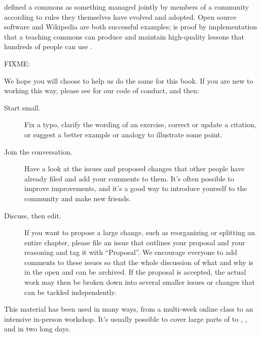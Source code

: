 
 defined a commons as
something managed jointly by members of a community
according to rules they themselves have evolved and adopted.
Open source software and Wikipedia are both successful examples;
 is proof by implementation that
a teaching commons can produce and maintain high-quality lessons
that hundreds of people can use \cite{Wils2016}.

FIXME: \cite{Deve2018}

We hope you will choose to help us do the same for this book.
If you are new to working this way,
please see  for our code of conduct,
and then:

\begin{description}

\item[Start small.]
  Fix a typo,
  clarify the wording of an exercise,
  correct or update a citation,
  or suggest a better example or analogy to illustrate some point.

\item[Join the conversation.]
  Have a look at the issues and proposed changes that other people have already filed
  and add your comments to them.
  It's often possible to improve improvements,
  and it's a good way to introduce yourself to the community and make new friends.

\item[Discuss, then edit.]
  If you want to propose a large change,
  such as reorganizing or splitting an entire chapter,
  please file an issue that outlines your proposal and your reasoning and tag it with ``Proposal''.
  We encourage everyone to add comments to these issues
  so that the whole discussion of what and why is in the open and can be archived.
  If the proposal is accepted,
  the actual work may then be broken down into several smaller issues or changes
  that can be tackled independently.

\end{description}


This material has been used in many ways,
from a multi-week online class to an intensive in-person workshop.
It's usually possible to cover large parts of  to ,
,
and  in two long days.

